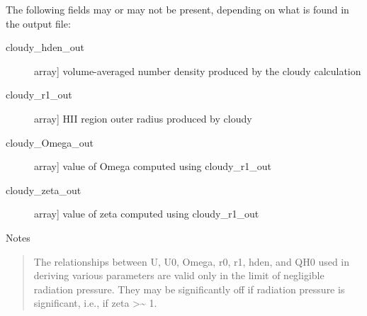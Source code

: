 \documentclass[letterpaper,10pt,english]{sphinxmanual}
\begin{document}
\begin{fulllineitems}
\begin{description}
The following fields may or may not be present, depending on
what is found in the output file:
\begin{description}
\item[{cloudy\_hden\_out}] \leavevmode{[}array{]}
volume-averaged number density produced by the cloudy
calculation

\item[{cloudy\_r1\_out}] \leavevmode{[}array{]}
HII region outer radius produced by cloudy

\item[{cloudy\_Omega\_out}] \leavevmode{[}array{]}
value of Omega computed using cloudy\_r1\_out

\item[{cloudy\_zeta\_out}] \leavevmode{[}array{]}
value of zeta computed using cloudy\_r1\_out

\end{description}

\end{description}

Notes
\begin{quote}

The relationships between U, U0, Omega, r0, r1, hden, and
QH0 used in deriving various parameters are valid only in
the limit of negligible radiation pressure. They may be
significantly off if radiation pressure is significant,
i.e., if zeta \textgreater{}\textasciitilde{} 1.
\end{quote}

\end{fulllineitems}

\end{document}

